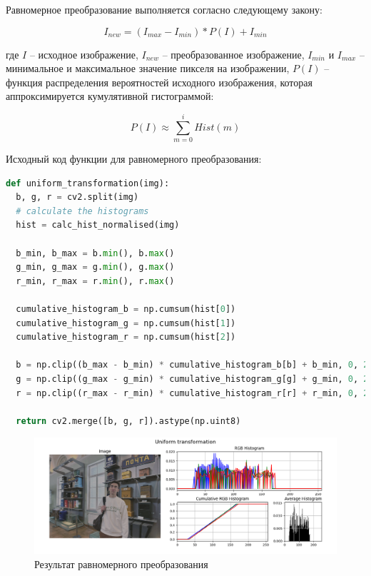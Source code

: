 Равномерное преобразование выполняется согласно следующему закону:

\begin{equation}
  I_{new} = \left( I_{max} - I_{min} \right) * P(I) + I_{min}
\end{equation}

где $I$ -- исходное изображение, $I_{new}$ -- преобразованное изображение, $I_{min}$ и $I_{max}$ -- минимальное и максимальное значение пикселя на изображении, $P(I)$ -- функция распределения вероятностей исходного изображения, которая аппроксимируется кумулятивной гистограммой: 

\begin{equation}
  P(I) \approx \sum\limits_{m=0}^{i} Hist(m)
\end{equation}

Исходный код функции для равномерного преобразования:

\begin{lstlisting}[language=Python]
def uniform_transformation(img):
  b, g, r = cv2.split(img)
  # calculate the histograms
  hist = calc_hist_normalised(img)

  b_min, b_max = b.min(), b.max()
  g_min, g_max = g.min(), g.max()
  r_min, r_max = r.min(), r.max()

  cumulative_histogram_b = np.cumsum(hist[0]) 
  cumulative_histogram_g = np.cumsum(hist[1])
  cumulative_histogram_r = np.cumsum(hist[2])

  b = np.clip((b_max - b_min) * cumulative_histogram_b[b] + b_min, 0, 255)
  g = np.clip((g_max - g_min) * cumulative_histogram_g[g] + g_min, 0, 255)
  r = np.clip((r_max - r_min) * cumulative_histogram_r[r] + r_min, 0, 255)

  return cv2.merge([b, g, r]).astype(np.uint8)
\end{lstlisting}

\begin{figure}[H]
    \centering
    \includegraphics[width=\textwidth]{../results/Uniform transformation.png}
    \caption{Результат равномерного преобразования}
    \label{fig:uniform}
\end{figure}


